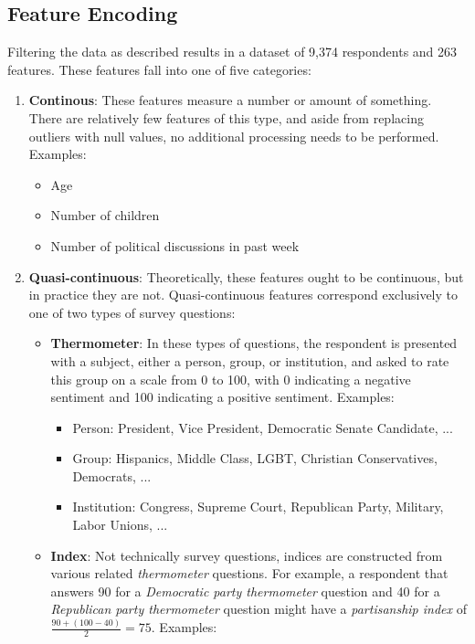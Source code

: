 \documentclass{article}
\begin{document}
	\subsection{Feature Encoding}
	
	Filtering the data as described results in a dataset of 9,374 respondents and 263 features. These features fall into one of five categories:
	
	\begin{enumerate}
		\item{\textbf{Continous}: These features measure a number or amount of something. There are relatively few features of this type, and aside from replacing outliers with null values, no additional processing needs to be performed. Examples:
			\begin{itemize}
				\item{Age}
				\item{Number of children}
				\item{Number of political discussions in past week}
			\end{itemize}
		}
		\item{\textbf{Quasi-continuous}: Theoretically, these features ought to be continuous, but in practice they are not. Quasi-continuous features correspond exclusively to one of two types of survey questions:
			\begin{itemize}
				\item{\textbf{Thermometer}: In these types of questions, the respondent is presented with a subject, either a person, group, or institution, and asked to rate this group on a scale from 0 to 100, with 0 indicating a negative sentiment and 100 indicating a positive sentiment. Examples:
					\begin{itemize}
						\item{Person: President, Vice President, Democratic Senate Candidate, ...}
						\item{Group: Hispanics, Middle Class, LGBT, Christian Conservatives, Democrats, ...}
						\item{Institution: Congress, Supreme Court, Republican Party, Military, Labor Unions, ...}
					\end{itemize}
				}
				\item{\textbf{Index}: Not technically survey questions, indices are constructed from various related \textit{thermometer} questions. For example, a respondent that answers 90 for a \textit{Democratic party thermometer} question and 40 for a \textit{Republican party thermometer} question might have a \textit{partisanship index} of $\frac{90 + (100 - 40)}{2} = 75$. Examples:
}
\end{itemize}}
\end{enumerate}
\end{document}
